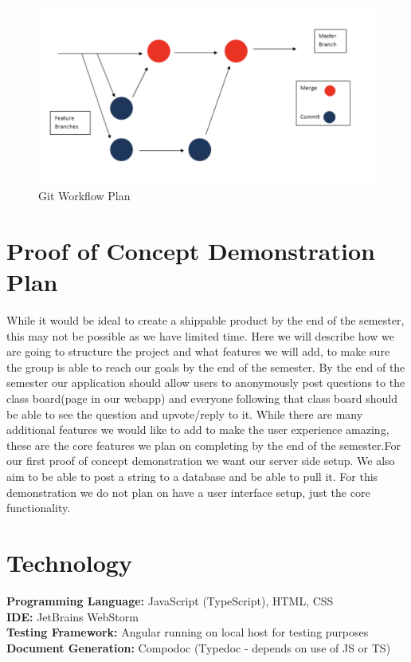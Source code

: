 \documentclass{article}
\begin{document}
\begin{figure}[h!]
  \centering 
  \includegraphics[scale=.69]{img/plan.png}
  \caption{Git Workflow Plan}
  \label{plan}
\end{figure}

\section{Proof of Concept Demonstration Plan}
While it would be ideal to create a shippable product by the end of the semester, this may not be possible as we have limited time. Here we will describe how we are going to structure the project and what features we will add, to make sure the group is able to reach our goals by the end of the semester. By the end of the semester our application should allow users to anonymously post questions to the class board(page in our webapp) and everyone following that class board should be able to see the question and upvote/reply to it. While there are many additional features we would like to add to make the user experience amazing, these are the core features we plan on completing by the end of the semester.For our first proof of concept demonstration we want our server side setup. We also aim to be able to post a string to a database and be able to pull it. For this demonstration we do not plan on have a user interface setup, just the core functionality.

\section{Technology}

\textbf{Programming Language:} JavaScript (TypeScript), HTML, CSS \\ 
\textbf{IDE:} JetBrains WebStorm\\
\textbf{Testing Framework:} Angular running on local host for testing purposes \\
\textbf{Document Generation:} Compodoc (Typedoc - depends on use of JS or TS) \\ 
\end{document}
